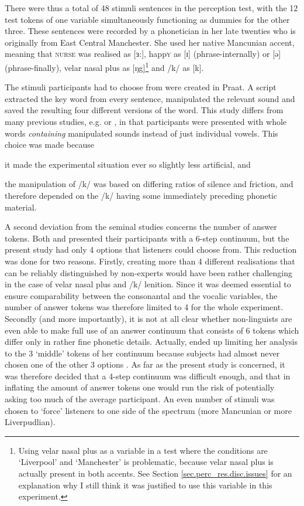 There were thus a total of 48 stimuli sentences in the perception test, with the 12 test tokens of one variable simultaneously functioning as dummies for the other three.
These sentences were recorded by a phonetician in her late twenties who is originally from East Central Manchester.
She used her native Mancunian accent, meaning that \textsc{nurse} was realised as [ɜ:], happ\textsc{y} as [ɪ] (phrase-internally) or [ə] (phrase-finally), velar nasal plus as [ŋg]\footnote{Using velar nasal plus as a variable in a  test where the conditions are `Liverpool' and `Manchester' is problematic, because velar nasal plus is actually present in both accents. See Section \ref{sec.perc_res.disc.issues} for an explanation why I still think it was justified to use this variable in this  experiment.} and /k/ as [k].

The stimuli participants had to choose from were created in Praat.
A script extracted the key word from every sentence, manipulated the relevant sound and saved the resulting four different versions of the word.
This study differs from many previous studies, e.g. \cite{hayetal2006a} or \cite{niedzielski1999}, in that participants were presented with whole words \emph{containing} manipulated sounds instead of just individual vowels.
This choice was made because
\begin{inparaenum}[(a)]
	\item it made the experimental situation ever so slightly less artificial, and
	\item the manipulation of /k/ was based on differing ratios of silence and friction, and therefore depended on the /k/ having some immediately preceding phonetic material.
\end{inparaenum}
A second deviation from the seminal studies concerns the number of answer tokens.
Both \citeauthor{niedzielski1999} and \citeauthor{hayetal2006a} presented their participants with a 6-step continuum, but the present study had only 4 options that listeners could choose from.
This reduction was done for two reasons.
Firstly, creating more than 4 different realisations that can be reliably distinguished by non-experts would have been rather challenging in the case of velar nasal plus and /k/ lenition.
Since it was deemed essential to ensure comparability between the consonantal and the vocalic variables, the number of answer tokens was therefore limited to 4 for the whole experiment.
Secondly (and more importantly), it is not at all clear whether non-linguists are even able to make full use of an answer continuum that consists of 6 tokens which differ only in rather fine phonetic details.
Actually, \citealt{niedzielski1999} ended up limiting her analysis to the 3 `middle' tokens of her continuum because subjects had almost never chosen one of the other 3 options \parencite[cf.][64--65]{niedzielski1999}.
As far as the present study is concerned, it was therefore decided that a 4-step continuum was difficult enough, and that in inflating the amount of answer tokens one would run the risk of potentially asking too much of the average participant.
An even number of stimuli was chosen to `force' listeners to one side of the spectrum (more Mancunian or more Liverpudlian).

